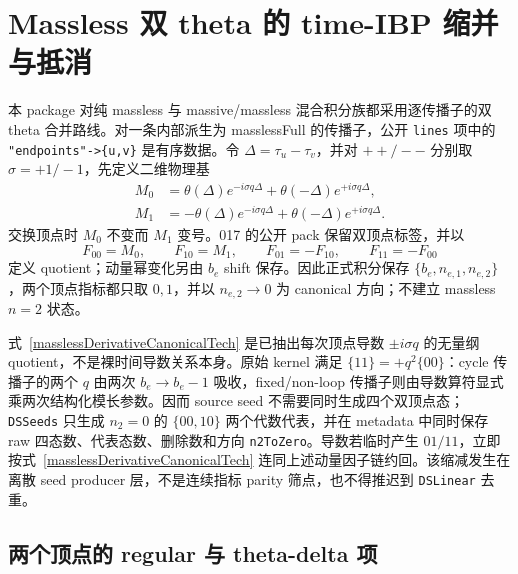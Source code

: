 ﻿\documentclass[a4paper,11pt]{article}
\begin{document}
\section{Massless 双 theta 的 time-IBP 缩并与抵消}

本 package 对纯 massless 与 massive/massless 混合积分族都采用逐传播子的双 theta 合并路线。对一条内部派生为 masslessFull 的传播子，公开 \texttt{lines} 项中的 \texttt{"endpoints"->\{u,v\}} 是有序数据。令 $\Delta=\tau_u-\tau_v$，并对 $++/--$ 分别取 $\sigma=+1/-1$，先定义二维物理基
\begin{align}
 M_0 &=
 \theta(\Delta)e^{-i\sigma q\Delta}
 +\theta(-\Delta)e^{+i\sigma q\Delta},\\
 M_1 &=
 -\theta(\Delta)e^{-i\sigma q\Delta}
 +\theta(-\Delta)e^{+i\sigma q\Delta}.
 \label{masslessM01Tech}
\end{align}
交换顶点时 $M_0$ 不变而 $M_1$ 变号。017 的公开 pack 保留双顶点标签，并以
\begin{equation}
 F_{00}=M_0,\qquad F_{10}=M_1,\qquad
 F_{01}=-F_{10},\qquad F_{11}=-F_{00}
 \label{masslessDerivativeCanonicalTech}
\end{equation}
定义 quotient；动量幂变化另由 $b_e$ shift 保存。因此正式积分保存 $\{b_e,n_{e,1},n_{e,2}\}$，两个顶点指标都只取 $0,1$，并以 $n_{e,2}\to0$ 为 canonical 方向；不建立 massless $n=2$ 状态。

式~\eqref{masslessDerivativeCanonicalTech} 是已抽出每次顶点导数 $\pm i\sigma q$ 的无量纲 quotient，不是裸时间导数关系本身。原始 kernel 满足 $\{11\}=+q^2\{00\}$：cycle 传播子的两个 $q$ 由两次 $b_e\to b_e-1$ 吸收，fixed/non-loop 传播子则由导数算符显式乘两次结构化模长参数。因而 source seed 不需要同时生成四个双顶点态；\texttt{DSSeeds} 只生成 $n_2=0$ 的 $\{00,10\}$ 两个代数代表，并在 metadata 中同时保存 raw 四态数、代表态数、删除数和方向 \texttt{n2ToZero}。导数若临时产生 $01/11$，立即按式~\eqref{masslessDerivativeCanonicalTech} 连同上述动量因子链约回。该缩减发生在离散 seed producer 层，不是连续指标 parity 筛点，也不得推迟到 \texttt{DSLinear} 去重。

\subsection{两个顶点的 regular 与 theta-delta 项}
\end{document}
